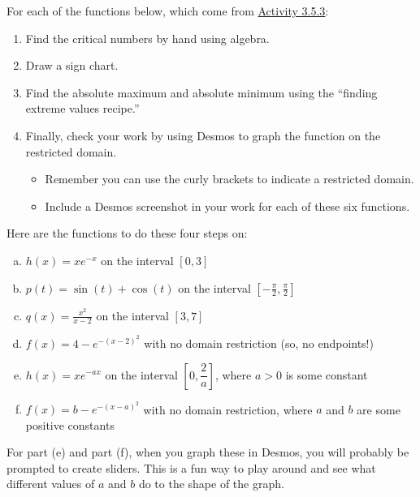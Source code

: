 For each of the functions below, which come from \href{https://activecalculus.org/single/sec-3-5-optimization.html#act-3-5-2}{Activity 3.5.3}:
\begin{enumerate}
    \item Find the critical numbers \colorbox[HTML]{bfedd2}{by hand using algebra.}
    \item Draw a \colorbox[HTML]{c2e0f4}{sign chart.}
    \item Find the absolute maximum and absolute minimum using the \colorbox[HTML]{eccafa}{``finding extreme values recipe.''}
    \item Finally, \colorbox[HTML]{f8cac6}{check your work by using Desmos} to graph the function on the restricted domain.
    \begin{itemize}
        \item Remember you can use the curly brackets to indicate a restricted domain.
        \item Include a Desmos screenshot in your work for each of these six functions.
    \end{itemize}
\end{enumerate}

\hrulefill

{ \everymath{\displaystyle}
\vspace{1em}
Here are the functions to do these four steps on:  

\begin{enumerate}[(a)]
    \item $h(x) = xe^{-x}$ on the interval $[0, 3]$
    \item $p(t) = \sin(t) + \cos(t)$ on the interval $\left[-\frac{\pi}{2}, \frac{\pi}{2}\right]$
    \item $q(x) = \frac{x^2}{x-2}$ on the interval $[3, 7]$
    \item $f(x) = 4 - e^{-(x-2)^2}$ with no domain restriction (so, no endpoints!)
    \item $h(x) = xe^{-ax}$ on the interval $\left[0, \dfrac2a\right]$, where $a > 0$ is some constant
    \item $f(x) = b - e^{-(x-a)^2}$ with no domain restriction, where $a$ and $b$ are some positive constants
\end{enumerate}
}

\hrulefill
\vspace{1em}

For part (e) and part (f), when you graph these in Desmos, you will probably be prompted to create sliders. This is a fun way to play around and see what different values of $a$ and $b$ do to the shape of the graph.


